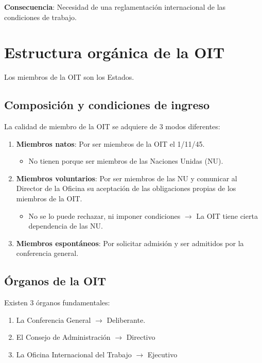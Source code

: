 \documentclass[spanish,12pt,a4paper,titlepage]{report}
\begin{document}
\textbf{Consecuencia}: Necesidad de una reglamentación internacional de las condiciones de trabajo.

\section{Estructura orgánica de la OIT}
\label{sec:estructura-organica-de-la-oit}

Los miembros de la OIT son los Estados.

\subsection{Composición y condiciones de ingreso}
\label{sec:composicion-y-condiciones-de-ingreso}

La calidad de miembro de la OIT se adquiere de 3 modos diferentes:

\begin{enumerate}
\item \textbf{Miembros natos}: Por ser miembros de la OIT el 1/11/45.
  \begin{itemize}
  \item No tienen porque ser miembros de las Naciones Unidas (NU).
  \end{itemize}
\item \textbf{Miembros voluntarios}: Por ser miembros de las NU y comunicar al Director de la Oficina su aceptación de las obligaciones propias de los miembros de la OIT.
  \begin{itemize}
  \item No se lo puede rechazar, ni imponer condiciones $\rightarrow$ La OIT tiene cierta dependencia de las NU.
  \end{itemize}
\item \textbf{Miembros espontáneos}: Por solicitar admisión y ser admitidos por la conferencia general.
\end{enumerate}

\subsection{Órganos de la OIT}
\label{sec:organos-de-la-oit}

Existen 3 órganos fundamentales:
\begin{enumerate}
\item La Conferencia General $\rightarrow$ Deliberante.
\item El Consejo de Administración $\rightarrow$ Directivo
\item La Oficina Internacional del Trabajo $\rightarrow$ Ejecutivo
\end{enumerate}
\end{document}
